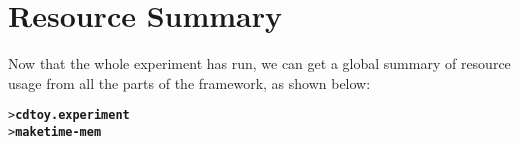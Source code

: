 \documentclass[11pt,letterpaper]{article}
\begin{document}
\section{Resource Summary} \label{ResourceSummary}

Now that the whole experiment has run, we can get a global summary of resource
usage from all the parts of the framework, as shown below:

\begin{small}
\begin{alltt}
> \textbf{cd toy.experiment}
> \textbf{make time-mem}
\end{alltt}
\end{small}
\vspace{-2em}
\end{document}
